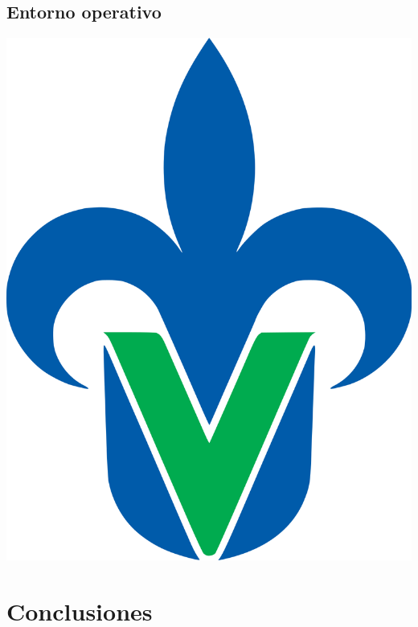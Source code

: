 \documentclass[12pt,a4paper]{book}
\begin{document}
\section{Entorno operativo}
\vspace{0.5 cm}

\includegraphics[scale=0.1]{uvlogo}

	 	
\chapter{Conclusiones} 
	 
  
\end{document}
